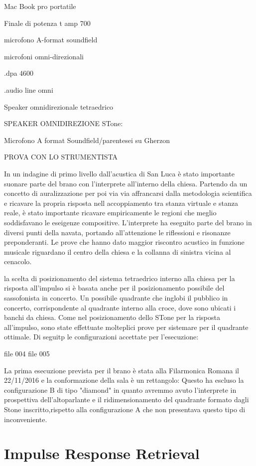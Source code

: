 Mac Book pro portatile

Finale di potenza t amp 700

microfono A-format soundfield

microfoni omni-direzionali

.dpa 4600

.audio line omni

Speaker omnidirezionale tetraedrico

SPEAKER OMNIDIREZIONE STone:

Microfono A format Soundfield/parentesei su Gherzon

PROVA CON LO STRUMENTISTA

In un indagine di primo livello dall'acustica di San Luca è stato importante suonare parte del brano con l'interprete all'interno della chiesa. Partendo da un concetto di auralizzazione per poi via via affrancarsi dalla metodologia scientifica e ricavare la propria risposta nell accoppiamento tra stanza virtuale e stanza reale, è stato importante ricavare empiricamente le regioni che meglio soddisfavano le eseigenze compositive. L'interprete ha eseguito parte del brano in diversi punti della navata, portando all'attenzione le riflessioni e risonanze preponderanti. 
Le prove che hanno dato maggior riscontro acustico in funzione musicale riguardano il centro della chiesa e la collanna di sinistra vicina al cenacolo.

la scelta di posizionamento del sistema tetraedrico interno alla chiesa per la risposta all'impulso si è basata anche per il posizionamento possibile del sassofonista in concerto.
Un possibile quadrante che inglobi il pubblico in concerto, corrispondente al quadrante interno alla croce, dove sono ubicati i banchi da chiesa.
Come nel posizionamento dello STone per la risposta all'impulso, sono state effettuate molteplici prove per sistemare per il quadrante ottimale. Di seguitp le configurazioni accettate per l'esecuzione:

file 004     file 005

La prima esecuzione prevista per il brano è stata alla Filarmonica Romana il 22/11/2016 e la conformazione della sala è un rettangolo: Questo ha escluso la configurazione B di tipo "diamond" in quanto avremmo avuto l'interprete in prospettiva dell'altoparlante e il ridimensionamento del quadrante formato dagli Stone inscritto,rispetto alla configurazione A che non presentava questo tipo di inconveniente.

\section{Impulse Response Retrieval} 

